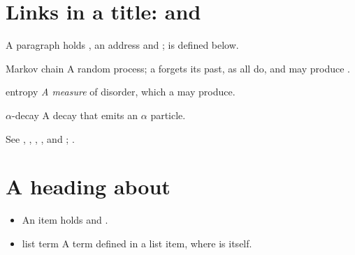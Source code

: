 \flmHeading[toc=true]
\section{Links in a title:  and }{\flmLabels{}}

A paragraph holds , an address  and ;  is defined below.

\begin{defterm}{Markov chain}\ignorespaces
A random process; a  forgets its past, as all  do, and may produce .
\end{defterm}

\begin{defterm}{entropy}\ignorespaces
\emph{A measure} of disorder, which a  may produce.
\end{defterm}

\begin{defterm}{\(\alpha\)-decay}\ignorespaces
A decay that emits an \(\alpha\) particle.
\end{defterm}

See , , , ,  and ; .

\flmHeading[toc=true]
\section{A heading about }{\flmLabels{}}

\begin{itemize}
\item An item holds  and .
\item\begin{defterm}{list term}\ignorespaces
A term defined in a list item, where  is itself.
\end{defterm}
\end{itemize}

